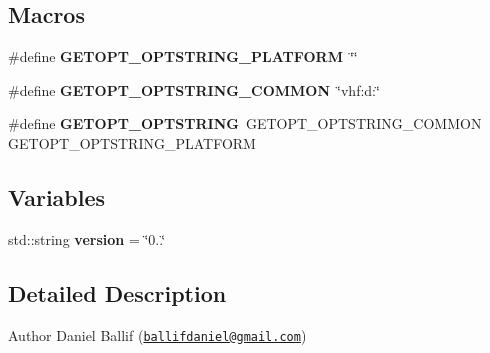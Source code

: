 \subsection*{Macros}
\begin{DoxyCompactItemize}
\item 
\mbox{\label{telemetry_8hh_a3f45aded700251c1c65619ffef6bcd8f}} 
\#define {\bfseries G\+E\+T\+O\+P\+T\+\_\+\+O\+P\+T\+S\+T\+R\+I\+N\+G\+\_\+\+P\+L\+A\+T\+F\+O\+RM}~\char`\"{}\char`\"{}
\item 
\mbox{\label{telemetry_8hh_ae671aa30ca7aa44c6ca07a705d464974}} 
\#define {\bfseries G\+E\+T\+O\+P\+T\+\_\+\+O\+P\+T\+S\+T\+R\+I\+N\+G\+\_\+\+C\+O\+M\+M\+ON}~\char`\"{}vhf\+:d\+:\char`\"{}
\item 
\mbox{\label{telemetry_8hh_ae3217a88cef78a3de990b54a4e0d51e5}} 
\#define {\bfseries G\+E\+T\+O\+P\+T\+\_\+\+O\+P\+T\+S\+T\+R\+I\+NG}~G\+E\+T\+O\+P\+T\+\_\+\+O\+P\+T\+S\+T\+R\+I\+N\+G\+\_\+\+C\+O\+M\+M\+ON G\+E\+T\+O\+P\+T\+\_\+\+O\+P\+T\+S\+T\+R\+I\+N\+G\+\_\+\+P\+L\+A\+T\+F\+O\+RM
\end{DoxyCompactItemize}
\subsection*{Variables}
\begin{DoxyCompactItemize}
\item 
\mbox{\label{telemetry_8hh_a728b969e374aba4020e39aea7e02e64f}} 
std\+::string {\bfseries version} = \char`\"{}0..\char`\"{}
\end{DoxyCompactItemize}


\subsection{Detailed Description}
\begin{DoxyAuthor}{Author}
Daniel Ballif (\href{mailto:ballifdaniel@gmail.com}{\tt ballifdaniel@gmail.\+com}) 
\end{DoxyAuthor}

